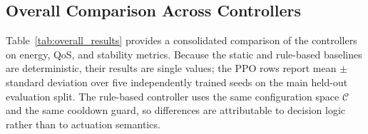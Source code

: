 \documentclass[a4paper,fleqn]{cas-sc}
\begin{document}
\subsection{Overall Comparison Across Controllers}
\label{subsec:overall}

Table~\ref{tab:overall_results} provides a consolidated comparison of the controllers on energy, QoS, and stability metrics. Because the static and rule-based baselines are deterministic, their results are single values; the PPO rows report mean $\pm$ standard deviation over five independently trained seeds on the main held-out evaluation split. The rule-based controller uses the same configuration space $\mathcal{C}$ and the same cooldown guard, so differences are attributable to decision logic rather than to actuation semantics.

\begin{table}[width=.9\linewidth,cols=7,pos=h]
\centering
\caption{Overall results on the main held-out evaluation split. Lower is better for $E_{\mathrm{tot}}$, $\overline{\mathrm{SEC}}$, and $v$. $n_{\mathrm{sw}}$ counts type-switch events (DPDK$\leftrightarrow$USR); $n_{\mathrm{sc}}$ counts horizontal scaling events (USR instance-count changes); $n_{\mathrm{bl}}$ counts change requests blocked by the cooldown guard. $E_{\mathrm{tot}}$ is in Wh and $\overline{\mathrm{SEC}}$ in Wh/Mbit. PPO rows report mean $\pm$ standard deviation over five seeds.}
\label{tab:overall_results}
\small
{}

\end{table}
\end{document}
